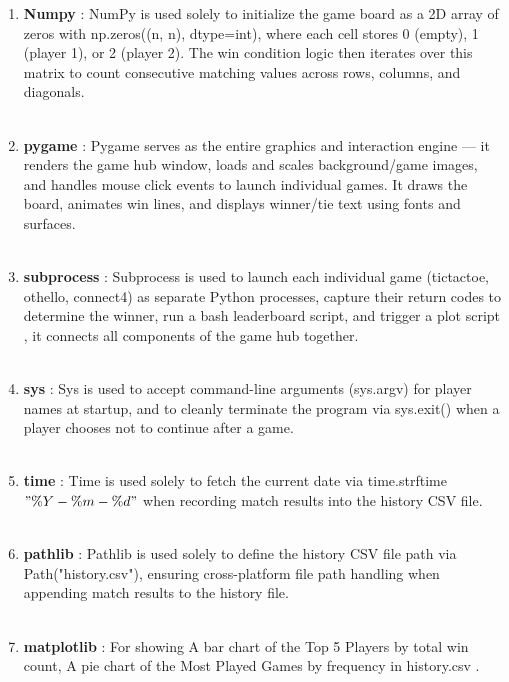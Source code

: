 \documentclass{report}
\begin{document}
\begin{enumerate}
    \item \textbf{Numpy}  : NumPy is used solely to initialize the game board as a 2D array of zeros with np.zeros((n, n), dtype=int), where each cell stores 0 (empty), 1 (player 1), or 2 (player 2). The win condition logic then iterates over this matrix to count consecutive matching values across rows, columns, and diagonals. \\
    \\
    \item \textbf{pygame} : Pygame serves as the entire graphics and interaction engine — it renders the game hub window, loads and scales background/game images, and handles mouse click events to launch individual games. It draws the board, animates win lines, and displays winner/tie text using fonts and surfaces. \\
    \\
    \item \textbf{subprocess} : Subprocess is used to launch each individual game (tictactoe, othello, connect4) as separate Python processes, capture their return codes to determine the winner, run a bash leaderboard script, and trigger a plot script , it  connects all components of the game hub together. \\ 
    \\
    \item \textbf{sys} : Sys is used to accept command-line arguments (sys.argv) for player names at startup, and to cleanly terminate the program via sys.exit() when a player chooses not to continue after a game. \\ 
    \\
    \item \textbf{time} : Time is used solely to fetch the current date via time.strftime\("\%Y-\%m-\%d"\) when recording match results into the history CSV file. \\
    \\
    \item \textbf{pathlib} : Pathlib is used solely to define the history CSV file path via Path("history.csv"), ensuring cross-platform file path handling when appending match results to the history file. \\
    \\
    \item \textbf{matplotlib} : For showing A bar chart of the Top 5 Players by total win count, A pie chart of the Most Played Games by frequency in history.csv .
\end{enumerate}
\clearpage
\end{document}
